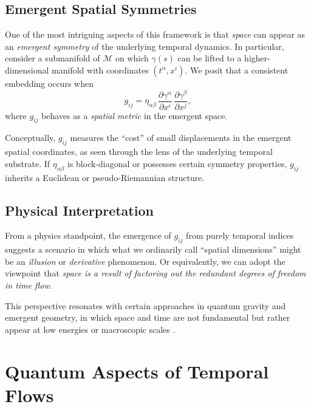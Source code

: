 \documentclass[12pt]{article}
\begin{document}
\subsection{Emergent Spatial Symmetries}
One of the most intriguing aspects of this framework is that \emph{space} can appear as an \emph{emergent symmetry} of the underlying temporal dynamics. In particular, consider a submanifold of $\mathcal{M}$ on which $\gamma(s)$ can be lifted to a higher-dimensional manifold with coordinates $(t^\alpha, x^i)$. We posit that a consistent embedding occurs when
\begin{equation}
g_{ij} = \eta_{\alpha\beta} \,\frac{\partial \gamma^{\alpha}}{\partial x^i} \,\frac{\partial \gamma^{\beta}}{\partial x^j},
\label{eq:induced_spatial_metric}
\end{equation}
where $g_{ij}$ behaves as a \emph{spatial metric} in the emergent space. 

Conceptually, $g_{ij}$ measures the ``cost'' of small displacements in the emergent spatial coordinates, as seen through the lens of the underlying temporal substrate. If $\eta_{\alpha\beta}$ is block-diagonal or possesses certain symmetry properties, $g_{ij}$ inherits a Euclidean or pseudo-Riemannian structure.

\subsection{Physical Interpretation}
From a physics standpoint, the emergence of $g_{ij}$ from purely temporal indices suggests a scenario in which what we ordinarily call ``spatial dimensions'' might be an \emph{illusion} or \emph{derivative} phenomenon. Or equivalently, we can adopt the viewpoint that \emph{space is a result of factoring out the redundant degrees of freedom in time flow}. 

This perspective resonates with certain approaches in quantum gravity and emergent geometry, in which space and time are not fundamental but rather appear at low energies or macroscopic scales \cite{oriti2009group,loll2019quantum}.

\section{Quantum Aspects of Temporal Flows}
\label{sec:quantum_aspects}
\end{document}
